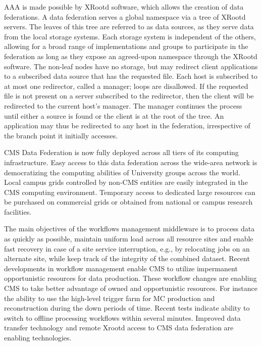\documentclass[11pt,a4paper]{article}
\begin{document}
AAA is made possible by XRootd software, which allows the creation of
data federations. A data federation serves a global namespace via a
tree of XRootd servers. The leaves of this tree are referred to as
data sources, as they serve data from the local storage systems.
Each storage system is independent of the others, allowing for a broad
range of implementations and groups to participate in the federation
as long as they expose an agreed-upon namespace through the XRootd
software. The non-leaf nodes have no storage, but may redirect client
applications to a subscribed data source that has the requested file.
Each host is subscribed to at most one redirector, called a manager;
loops are disallowed. If the requested file is not present on a server
subscribed to the redirector, then the client will be redirected to
the current host's manager.  The manager continues the process until
either a source is found or the client is at the root of the tree. An
application may thus be redirected to any host in the federation,
irrespective of the branch point it initially accesses.

CMS Data Federation is now fully deployed across all tiers of its
computing infrastructure. Easy access to this data federation across
the wide-area network is democratizing the computing abilities of
University groups across the world. Local campus grids controlled by
non-CMS entities are easily integrated in the CMS computing
environment. Temporary access to dedicated large resources can be
purchased on commercial grids or obtained from national or campus
research facilities.


The main objectives of the workflows management middleware is to
process data as quickly as possible, maintain uniform load across all
resource sites and enable fast recovery in case of a site service
interruption, e.g., by relocating jobs on an alternate site, while
keep track of the integrity of the combined dataset.  Recent
developments in workflow management enable CMS to utilize impermanent
opportunistic resources for data production. These workflow changes
are enabling CMS to take better advantage of owned and opportunistic
resources.  For instance the ability to use the high-level trigger
farm for MC production and reconstruction during the down periods of
time. Recent tests indicate ability to switch to offline processing
workflows within several minutes. Improved data transfer technology
and remote Xrootd access to CMS data federation are enabling
technologies.
\end{document}
